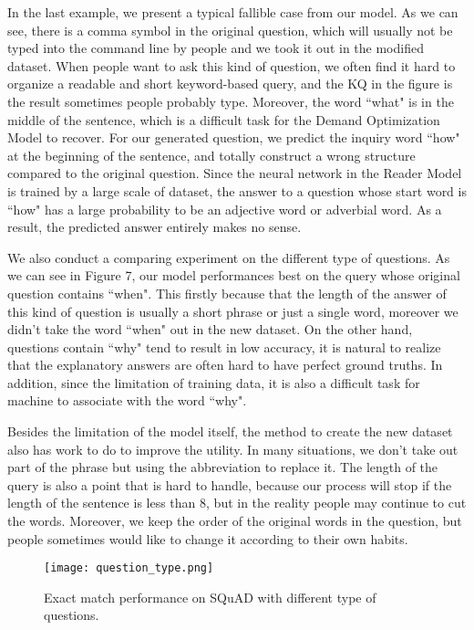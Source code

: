 \documentclass[sigconf]{acmart}
\begin{document}
In the last example, we present a typical fallible case from our model. As we can see, there is a comma symbol in the original question, which will usually not be typed into the command line by people and we took it out in the modified dataset. When people want to ask this kind of question, we often find it hard to organize a readable and short keyword-based query, and the KQ in the figure is the result sometimes people probably type. Moreover, the word ``what" is in the middle of the sentence, which is a difficult task for the Demand Optimization Model to recover. For our generated question, we predict the inquiry word ``how" at the beginning of the sentence, and totally construct a wrong structure compared to the original question. Since the neural network in the Reader Model is trained by a large scale of dataset, the answer to a question whose start word is ``how" has a large probability to be an adjective word or adverbial word. As a result, the predicted answer entirely makes no sense.

We also conduct a comparing experiment on the different type of questions. As we can see in Figure 7, our model performances best on the query whose original question contains ``when". This firstly because that the length of the answer of this kind of question is usually a short phrase or just a single word, moreover we didn't take the word ``when" out in the new dataset. On the other hand, questions contain ``why" tend to result in low accuracy, it is natural to realize that the explanatory answers are often hard to have perfect ground truths. In addition, since the limitation of training data, it is also a difficult task for machine to associate with the word ``why".


Besides the limitation of the model itself, the method to create the new dataset also has work to do to improve the utility. In many situations, we don't take out part of the phrase but using the abbreviation to replace it. The length of the query is also a point that is hard to handle, because our process will stop if the length of the sentence is less than 8, but in the reality people may continue to cut the words. Moreover, we keep the order of the original words in the question, but people sometimes would like to change it according to their own habits.

\begin{figure}[t]
  \begin{center}
  \texttt{[image: question\_type.png]}
  \caption{Exact match performance on SQuAD with different type of questions.}
  \end{center}
\end{figure}
\end{document}
